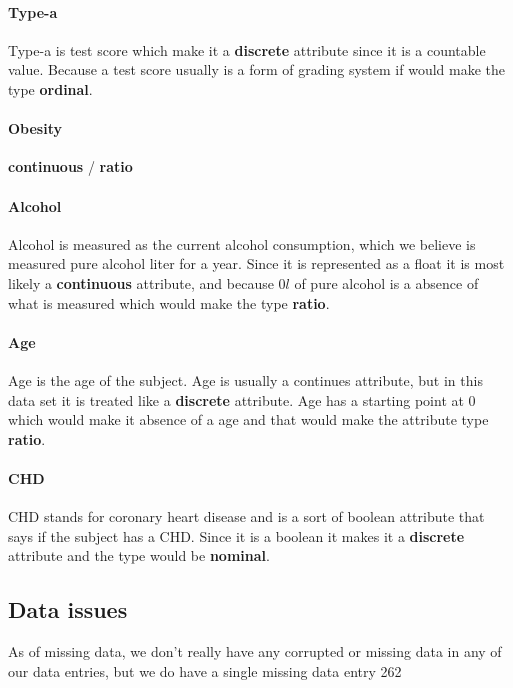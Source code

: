 \paragraph{Type-a} Type-a is test score which make it a \textbf{discrete} attribute since it is a countable value. Because a test score usually is a form of grading system if would make the type \textbf{ordinal}.

\paragraph{Obesity} \textbf{continuous} / \textbf{ratio}

\paragraph{Alcohol} Alcohol is measured as the current alcohol consumption, which we believe is measured pure alcohol liter for a year. Since it is represented as a float it is most likely a \textbf{continuous} attribute, and because $0l$ of pure alcohol is a absence of what is measured which would make the type \textbf{ratio}.

\paragraph{Age} Age is the age of the subject. Age is usually a continues attribute, but in this data set it is treated like a \textbf{discrete} attribute. Age has a starting point at 0 which would make it absence of a age and that would make the attribute type \textbf{ratio}.

\paragraph{CHD} CHD stands for coronary heart disease and is a sort of boolean attribute that says if the subject has a CHD. Since it is a boolean it makes it a \textbf{discrete} attribute and the type would be \textbf{nominal}.

\subsection{Data issues}

As of missing data, we don't really have any corrupted or missing data in any of our data entries, but we do have a single missing data entry 262